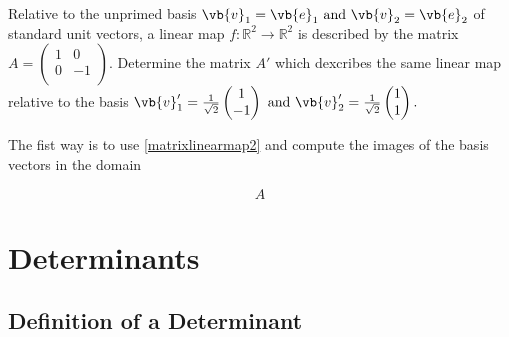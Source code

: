 \documentclass[a4paper,12pt]{report}
\begin{document}
{Relative to the unprimed basis \(\vb{v} _{1} = \vb{e} _{1} \text { and } \vb{v} _{2} = \vb{e} _{2}\) of standard unit vectors, a linear map \(f: \mathbb{R}^2 \rightarrow \mathbb{R}^2\) is described by the matrix \(A = \begin{pmatrix}
    1 &  0 \\
    0 &  -1 \\
\end{pmatrix}.\) Determine the matrix \(A'\) which dexcribes the same linear map relative to the basis \(\vb{v} _{1}' = \frac{1}{\sqrt{2} } \begin{pmatrix}
     1 \\
     -1 \\
\end{pmatrix} \text { and } \vb{v} _{2}' = \frac{1}{\sqrt{2} } \begin{pmatrix}
     1 \\
     1 \\
\end{pmatrix}.  \)   }
{The fist way is to use \cref{matrixlinearmap2} and compute the images of the basis vectors in the domain

\begin{equation}
    A
\end{equation}

 } 


\chapter{Determinants}

\section{Definition of a Determinant}
\end{document}
